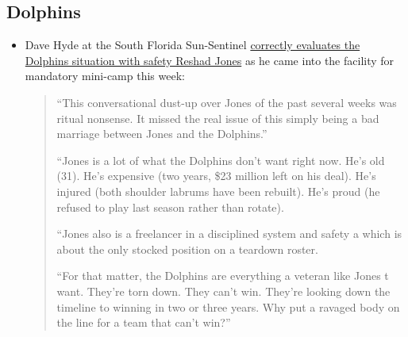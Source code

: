 \documentclass[11pt]{article}
\author{Tom Shannon}
\date{\today}
\title{}
\begin{document}
\subsection{Dolphins}

\begin{itemize}
\item Dave Hyde at the South  Florida Sun-Sentinel \href{https://www.sun-sentinel.com/sports/miami-dolphins/fl-sp-hyde-dolphins-reshad-camp-20190\
604-oxzw7owh5ngjbfcdblyn5eat4y-story.html}{correctly evaluates the Dolphins situation with safety Reshad Jones} as he came into the facility for mandatory mini-camp this week:                                                                                                        
                                                                                                                                            
\begin{quote}                                                                                                                               
``This conversational dust-up over Jones of the past several weeks was ritual nonsense. It missed the real issue of this simply being a bad
 marriage between Jones and the Dolphins.''                                                                                                 
                                                                                                                                            
``Jones is a lot of what the Dolphins don't want right now. He's old (31). He's expensive (two years, \$23 million left on his deal). He's 
injured (both shoulder labrums have been rebuilt). He's proud (he refused to play last season rather than rotate).                          
                                                                                                                                            
``Jones also is a freelancer in a disciplined system and safety a which is about the only stocked position on a teardown roster.            
                                                                                                                                            
``For that matter, the Dolphins are everything a veteran like Jones t want. They're torn down. They can't win. They're looking down the timeline to winning in two or three years. Why put a ravaged body on the line for a team that can't win?''                                     
\end{quote}                                                                                                                                 
                                                                                                                                            

\end{itemize}
\end{document}
